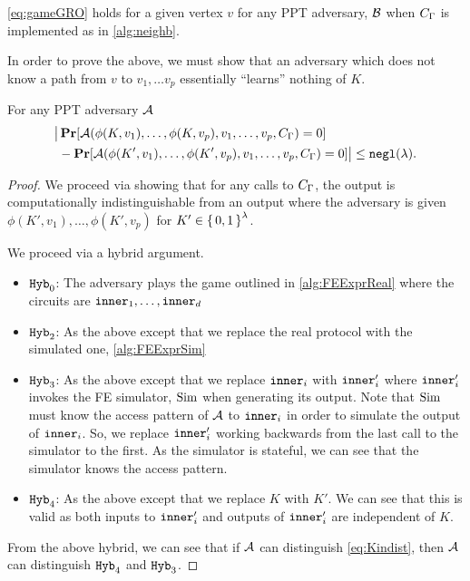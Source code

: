 \begin{claim} 
	\label{claim:sec}
	\cref{eq:gameGRO} holds for a given vertex $v$ for any PPT adversary, $\mathcal{B}$ when $C_\Gamma$ is implemented as in \cref{alg:neighb}.
\end{claim}
In order to prove the above, we must show that an adversary which does not know a path from $v$ to $v_1, \dots v_p$
essentially ``learns'' nothing of $K$.

\begin{lemma}
	\label{lemma:hardLearnK}
	For any PPT adversary $\mathcal{A}$
	\begin{align}
		\big| &\operatorname*{\mathbf{Pr}}[\mathcal{A}(\phi(K, v_1), \dots, \phi(K, v_p), v_1, \dots, v_p, C_\Gamma) = 0]
		\label{eq:Kindist}
		\\
		& - \operatorname*{\mathbf{Pr}}[\mathcal{A}(\phi(K', v_1), \dots, \phi(K', v_p), v_1, \dots, v_p, C_\Gamma) = 0]\big|
			\leq \texttt{negl}(\lambda). \notag
	\end{align}
	\begin{proof}
		We proceed via showing that for any calls to $C_\Gamma$, the output is computationally indistinguishable from 
		an output where the adversary is given $\phi(K', v_1), \dots, \phi(K', v_p)$ for $K' \in \set{0, 1}^\lambda$.
		
		We proceed via a hybrid argument.
		\begin{itemize}
			\item $\texttt{Hyb}_0$: The adversary plays the game outlined in \cref{alg:FEExprReal} where the circuits are $\texttt{inner}_1, \dots, \texttt{inner}_d$
			\item $\texttt{Hyb}_2$: As the above except that we replace the real protocol with the simulated one, \cref{alg:FEExprSim}
			\item $\texttt{Hyb}_3$: As the above except that we replace $\texttt{inner}_i$ with $\texttt{inner}_i'$ where $\texttt{inner}_i'$ invokes the FE simulator, $\text{Sim}$ when generating its output.
			Note that $\text{Sim}$ must know the access pattern of $\mathcal{A}$ to $\texttt{inner}_i$ in order to simulate the output of $\texttt{inner}_i$.
			So, we replace $\texttt{inner}_i'$ working backwards from the last call to the simulator to the first.
			As the simulator is stateful, we can see that the simulator knows the access pattern.
			\item $\texttt{Hyb}_4$: As the above except that we replace $K$ with $K'$.
			We can see that this is valid as both inputs to $\texttt{inner}'_i$ and outputs of $\texttt{inner}'_i$ are independent of $K$.
		\end{itemize}
	From the above hybrid, we can see that if $\mathcal{A}$ can distinguish \cref{eq:Kindist}, then 
	$\mathcal{A}$ can distinguish $\texttt{Hyb}_4$ and $\texttt{Hyb}_3$.
	\end{proof}
\end{lemma}

